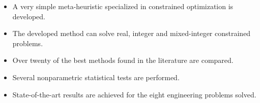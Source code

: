 \documentclass[A4, 11pt, preprint]{elsarticle}
\begin{document}
\begin{itemize}

\item A very simple meta-heuristic specialized in constrained optimization is developed.

\item The developed method can solve real, integer and mixed-integer constrained problems.

\item Over twenty of the best methods found in the literature are compared.

\item Several nonparametric statistical tests are performed.

\item State-of-the-art results are achieved for the eight engineering problems solved.

\end{itemize}
\end{document}
